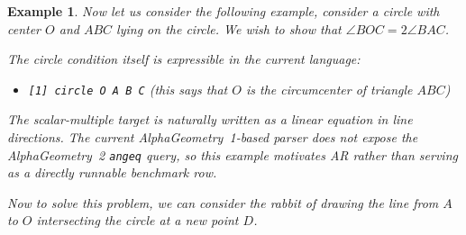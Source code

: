 \documentclass[reqno]{amsart}
\DeclareMathOperator{\1}{\textbf{1}}
\newtheorem{example}[thm]{Example}
\begin{document}
\begin{example}
    Now let us consider the following example, consider a circle with center $O$
    and $ABC$ lying on the circle. We wish to show that $\angle BOC=2\angle
    BAC$.

    \begin{center}
    \end{center}

    The circle condition itself is expressible in the current language:
    \begin{itemize}
        \item \verb|[1] circle O A B C| (this says that $O$ is the circumcenter of triangle $ABC$)
    \end{itemize}
    The scalar-multiple target is naturally written as a linear equation in
    line directions.  The current AlphaGeometry~1-based parser does not expose
    the AlphaGeometry~2 \verb|angeq| query, so this example motivates AR rather
    than serving as a directly runnable benchmark row.

    Now to solve this problem, we can consider the rabbit of drawing the line
    from $A$ to $O$ intersecting the circle at a new point $D$.

    \begin{center}
        \begin{tikzpicture}[scale=1.5, font=\sffamily]
    

\end{tikzpicture}
\end{center}
\end{example}
\end{document}
